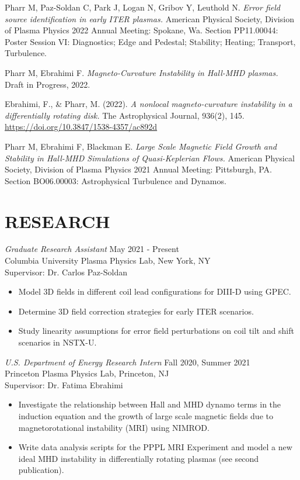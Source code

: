 \documentclass[margin]{rpires}
\begin{document}
\begin{resume}

Pharr M, Paz-Soldan C, Park J, Logan N, Gribov Y, Leuthold N. {\sl Error field source identification in early ITER plasmas.} American Physical Society, Division of Plasma Physics 2022 Annual Meeting: Spokane, Wa. Section PP11.00044: Poster Session VI: Diagnostics; Edge and Pedestal; Stability; Heating; Transport, Turbulence.

Pharr M, Ebrahimi F. {\sl Magneto-Curvature Instability in Hall-MHD plasmas.} Draft in Progress, 2022.

Ebrahimi, F., \& Pharr, M. (2022). {\sl A nonlocal magneto-curvature instability in a differentially rotating disk.} The Astrophysical Journal, 936(2), 145. \href{https://doi.org/10.3847/1538-4357/ac892d}{https://doi.org/10.3847/1538-4357/ac892d} 

Pharr M, Ebrahimi F, Blackman E. {\sl Large Scale Magnetic Field Growth and Stability in Hall-MHD Simulations of Quasi-Keplerian Flows.} American Physical Society, Division of Plasma Physics 2021 Annual Meeting: Pittsburgh, PA. Section BO06.00003: Astrophysical Turbulence and Dynamos.


\section{RESEARCH}
    {\sl Graduate Research Assistant} \hfill May 2021 - Present \\
    Columbia University Plasma Physics Lab, 
    New York, NY\\ 
    Supervisor: Dr. Carlos Paz-Soldan
    \begin{itemize}  \itemsep -2pt %
    \item Model 3D fields in different coil lead configurations for DIII-D using GPEC.
    \item Determine 3D field correction strategies for early ITER scenarios.
    \item Study linearity assumptions for error field perturbations on coil tilt and shift scenarios in NSTX-U. 
    \end{itemize}

    {\sl U.S. Department of Energy Research Intern} \hfill Fall 2020, Summer 2021 \\
    Princeton Plasma Physics Lab, 
    Princeton, NJ\\ 
    Supervisor: Dr. Fatima Ebrahimi
    \begin{itemize}  \itemsep -2pt %
    \item Investigate the relationship between Hall and MHD dynamo terms in the induction equation and the growth of large scale magnetic fields due to magnetorotational instability (MRI) using NIMROD.
    \item Write data analysis scripts for the PPPL MRI Experiment and model a new ideal MHD instability in differentially rotating plasmas (see second publication).
    \end{itemize}


\end{resume}
\end{document}
